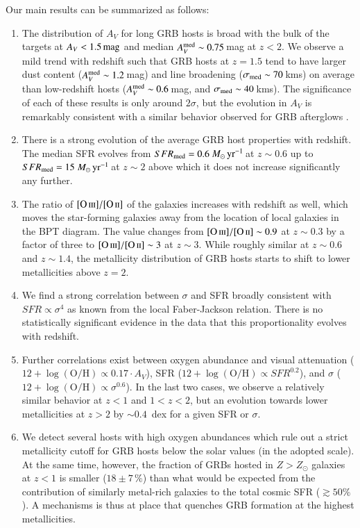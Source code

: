 \documentclass[traditabstract, longauth]{aa}
\newcommand{\oh}{12+\log(\mathrm{O/H})}
\newcommand{\oii}{[\ion{O}{ii}]}
\newcommand{\oiii}{[\ion{O}{iii}]}
\newcommand{\Msunyr}{$M_\odot\,\rm{yr}^{-1}$}
\begin{document}
Our main results can be summarized as follows:
\begin{enumerate}
\item The distribution of $A_V$ for long GRB hosts is broad with the bulk of the targets at $A_V<1.5\,\rm{mag}$ and median $A_V^{\rm med} \sim 0.75$\,mag at $z<2$. We observe a mild trend with redshift such that GRB hosts at $z = 1.5$ tend to have larger dust content ($A_V^{\rm med} \sim 1.2$\,mag) and line broadening ($\sigma_{\rm{med}}\sim70$\,kms) on average than low-redshift hosts ($A_V^{\rm med} \sim 0.6$\,mag, and $\sigma_{\rm{med}}\sim40$\,kms). The significance of each of these results is only around $2\sigma$, but the evolution in $A_V$ is remarkably consistent with a similar behavior observed for GRB afterglows \citep{2013MNRAS.432.1231C}.
\item There is a strong evolution of the average GRB host properties with redshift. The median SFR evolves from $SFR_{\rm{med}} = 0.6$\,\Msunyr\,at $z\sim0.6$ up to $SFR_{\rm{med}} = 15$\,\Msunyr\,at $z\sim2$ above which it does not increase significantly any further. 
\item The ratio of $\oiii/\oii$ of the galaxies increases with redshift as well, which moves the star-forming galaxies away from the location of local galaxies in the BPT diagram. The value changes from  $\oiii/\oii\sim0.9$ at $z\sim0.3$ by a factor of three to $\oiii/\oii\sim3$ at $z\sim3$. While roughly similar at $z\sim0.6$ and $z\sim1.4$, the metallicity distribution of GRB hosts starts to shift to lower metallicities above $z=2$.
\item We find a strong correlation between $\sigma$ and SFR broadly consistent with ${SFR}\propto\sigma^4$ as known from the local Faber-Jackson relation. There is no statistically significant evidence in the data that this proportionality evolves with redshift. 
\item Further correlations exist between oxygen abundance and visual attenuation ($\oh \propto 0.17\cdot A_V$), SFR  ($\oh \propto {SFR}^{0.2}$), and $\sigma$ ($\oh \propto\sigma^{0.6}$). In the last two cases, we observe a relatively similar behavior at $z < 1$ and $1<z<2$, but an evolution towards lower metallicities at $z > 2$ by $\sim 0.4$~dex for a given SFR or $\sigma$.

\item We detect several hosts with high oxygen abundances which rule out a strict metallicity cutoff for GRB hosts below the solar values (in the adopted scale). At the same time, however, the fraction of GRBs hosted in $Z>Z_{\odot}$ galaxies at $z<1$ is smaller ($18\pm7\,\%$) than what would be expected from the contribution of similarly metal-rich galaxies to the total cosmic SFR ($\gtrsim 50\%$). A mechanisms is thus at place that quenches GRB formation at the highest metallicities. 
\end{enumerate}
\end{document}

